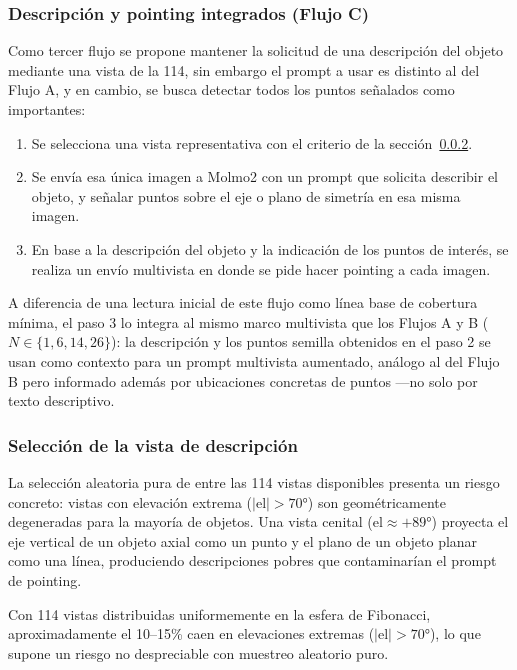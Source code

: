 \subsubsection{Descripción y pointing integrados (Flujo C)}

Como tercer flujo se propone mantener la solicitud de una descripción del objeto
mediante una vista de la 114, sin embargo el prompt a usar es distinto al del
Flujo A, y en cambio, se busca detectar todos los puntos señalados como
importantes:

\begin{enumerate}
    \item Se selecciona una vista representativa con el criterio de la
          sección~\ref{sec:seleccion_vista}.
    \item Se envía esa única imagen a Molmo2 con un prompt que solicita
          describir el objeto, y señalar puntos sobre el eje o plano de
          simetría en esa misma imagen.
    \item En base a la descripción del objeto y la indicación de los puntos
          de interés, se realiza un envío multivista en donde se pide hacer
          pointing a cada imagen.
\end{enumerate}

A diferencia de una lectura inicial de este flujo como línea base de cobertura
mínima, el paso 3 lo integra al mismo marco multivista que los Flujos A y B
($N \in \{1, 6, 14, 26\}$): la descripción y los puntos semilla obtenidos en el
paso 2 se usan como contexto para un prompt multivista aumentado, análogo al
del Flujo B pero informado además por ubicaciones concretas de puntos —no solo
por texto descriptivo.

\subsubsection{Selección de la vista de descripción}
\label{sec:seleccion_vista}

La selección aleatoria pura de entre las 114 vistas disponibles presenta un riesgo
concreto: vistas con elevación extrema ($|\text{el}| > 70°$) son
geométricamente degeneradas para la mayoría de objetos. Una vista cenital
($\text{el} \approx +89°$) proyecta el eje vertical de un objeto axial como un
punto y el plano de un objeto planar como una línea, produciendo descripciones
pobres que contaminarían el prompt de pointing.

Con 114 vistas distribuidas uniformemente en la esfera de Fibonacci,
aproximadamente el 10--15\% caen en elevaciones extremas ($|\text{el}| > 70°$),
lo que supone un riesgo no despreciable con muestreo aleatorio puro.

